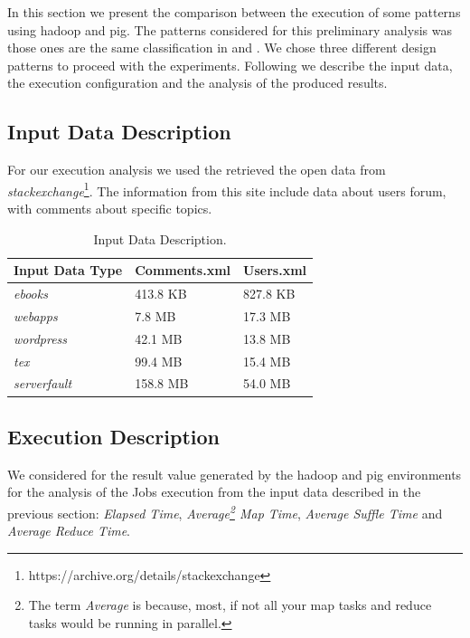 In this section we present the comparison between the execution of some patterns
using hadoop and pig. The patterns considered for this preliminary analysis was
those ones are the same classification in \cite{White:2012} and
\cite{pig-designpattern:2014}. We chose three different design patterns to
proceed with the experiments. Following we describe the input data, the
execution configuration and the analysis of the produced results. 

\subsection{Input Data Description}
 
For our execution analysis we used the retrieved the open data from
\textit{stackexchange}\footnote{https://archive.org/details/stackexchange}. The
information from this site include data about users forum, with comments
about specific topics. 

\begin{table}\centering \small
\begin{tabular}{|l|l|l|} \hline
\textbf{Input Data Type}		& \textbf{Comments.xml} & \textbf{Users.xml}  \\
\hline\hline 
\textit{ebooks}			&   413.8 KB    &      827.8 KB				\\ \hline
\textit{webapps}		&   7.8 MB	    &      17.3 MB 				\\ \hline
\textit{wordpress}		&   42.1 MB	    &      13.8 MB				\\ \hline
\textit{tex}			&   99.4 MB 	&      15.4 MB			 	\\ \hline
\textit{serverfault}	&   158.8 MB	&      54.0 MB				\\ \hline
  
\end{tabular}
\caption{\label{table:input-data-length} Input Data Description.}
\end{table}

 
\subsection{Execution Description}
 
 We considered for the result value generated by the hadoop and pig environments
 for the analysis of the Jobs execution from the input data described in the
 previous section: \textit{Elapsed Time}, \textit{Average\footnote{The term
 \textit{Average} is because, most, if not all your map tasks and reduce tasks
 would be running in parallel.} Map Time}, \textit{Average Suffle Time} and
 \textit{Average Reduce Time}.
  
